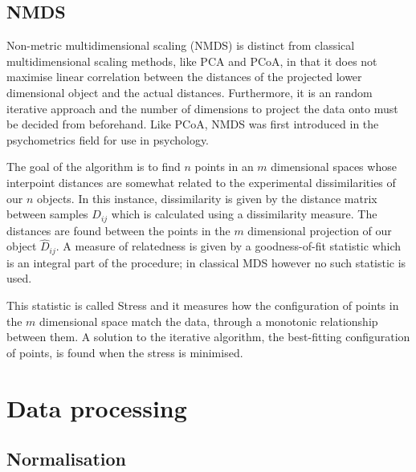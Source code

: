 \subsection{NMDS}
Non-metric multidimensional scaling (NMDS) is distinct from classical multidimensional scaling methods, like PCA and PCoA, in that it does not maximise linear correlation between the distances of the projected lower dimensional object and the actual distances. Furthermore, it is an random iterative approach and the number of dimensions to project the data onto must be decided from beforehand. Like PCoA, NMDS was first introduced in the psychometrics field for use in psychology.

The goal of the algorithm is to find $n$ points in an $m$ dimensional spaces whose interpoint distances are somewhat related to the experimental dissimilarities of our $n$ objects. In this instance, dissimilarity is given by the distance matrix between samples $D_{ij}$ which is calculated using a dissimilarity measure. The distances are found between the points in the $m$ dimensional projection of our object $\hat{D}_{ij}$. A measure of relatedness is given by a goodness-of-fit statistic which is an integral part of the procedure; in classical MDS however no such statistic is used.

This statistic is called Stress and it measures how the configuration of points in the $m$ dimensional space match the data, through a monotonic relationship between them. A solution to the iterative algorithm, the best-fitting configuration of points, is found when the stress is minimised.  


\section{Data processing}
\subsection{Normalisation}

